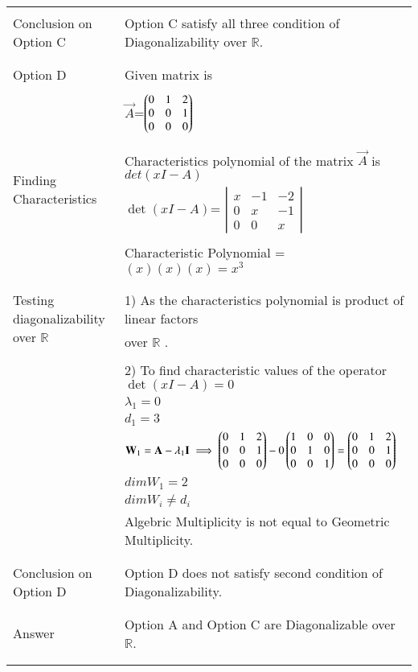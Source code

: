 \documentclass[journal,12pt]{IEEEtran}
\begin{document}
\begin{longtable}{|l|l|}
\hline
\multirow{3}{*}{Conclusion on Option C} & \\
& Option C satisfy all three condition of Diagonalizability over $\mathbb{R}$. \\
&\\
\hline\hline
\multirow{3}{*}{Option D} & \\
& Given matrix is  \\
&\\
& $\vec{A}$=$\begin{pmatrix}0&1&2\\0&0&1\\0&0&0\end{pmatrix}$\\
&\\
\hline
\multirow{3}{*}{Finding Characteristics} & \\
&
Characteristics polynomial of the matrix $\vec{A}$ is $det(xI-A)$\\ 
polynomial
& $\det(xI-A)$= $\left|
                \begin{array}{ccc}
                x & -1 & -2\\
                0 & x & -1\\
                0 & 0 & x
                \end{array} \right|$  \\
&\\
& Characteristic Polynomial = $(x)(x)(x)=x^3$\\
&\\
\hline
\multirow{3}{*}{Testing diagonalizability over $\mathbb{R}$} & \\
& 1) As the characteristics  polynomial is product of linear factors\\
&over $\mathbb{R}$ .\\
&\\
&2) To find characteristic values of the operator $\det(xI-A) = 0$ \\
& $\lambda_1= 0$\\
&$d_1=3$\\
&$\mathbf{W}_1=\mathbf{A}-\lambda_1\mathbf{I}\implies\begin{pmatrix}0&1&2\\0&0&1\\0&0&0\end{pmatrix}-0\begin{pmatrix}1&0&0\\0&1&0\\0&0&1\end{pmatrix}=\begin{pmatrix}0&1&2\\0&0&1\\0&0&0\end{pmatrix}$\\

&$dim W_1 = 2$\\
&$dim W_i \neq d_i$\\
&Algebric Multiplicity is not equal to Geometric Multiplicity.\\
&\\
\hline
\multirow{3}{*}{Conclusion on Option D} & \\
& Option D  does not satisfy second condition of Diagonalizability. \\
&\\
\hline \hline
\multirow{3}{*}{Answer} & \\
&Option A and Option C are Diagonalizable over $\mathbb{R}$.\\
&\\
\hline



\label{table:2}
\end{longtable}
\end{document}
